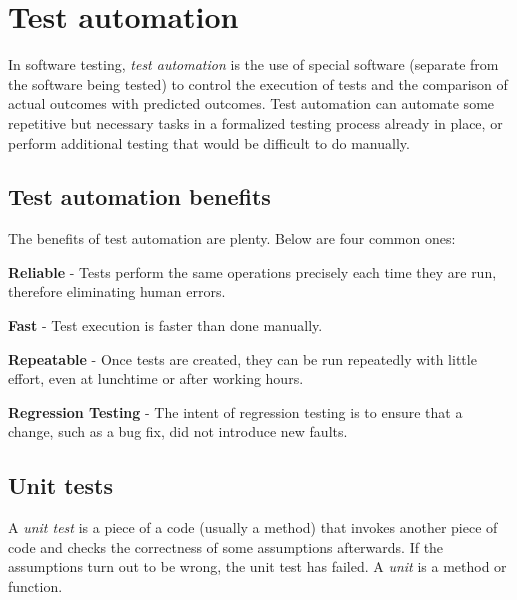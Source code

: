 \documentclass[
  print,
  table,
  nolof,
  nolot,
  nocover,
  oneside
]{fithesis3}
\begin{document}
\chapter{Test automation}
\label{test automation}

In software testing, \textit{test automation} is the use of special software (separate from the software being tested) to control the execution of tests and the comparison of actual outcomes with predicted outcomes. Test automation can automate some repetitive but necessary tasks in a formalized testing process already in place, or perform additional testing that would be difficult to do manually\parencite{test_automation}.

\section{Test automation benefits}
The benefits of test automation are plenty. Below are four common ones:

\begin{compactitem}
    \item \textbf{Reliable} - Tests perform the same operations precisely each time they are run, therefore eliminating human errors.
    \item \textbf{Fast} - Test execution is faster than done manually.
    \item \textbf{Repeatable} - Once tests are created, they can be run repeatedly with little effort, even at lunchtime or after working hours.
    \item \textbf{Regression Testing} - The intent of regression testing is to ensure that a change, such as a bug fix, did not introduce new faults\parencite{test_automation_benefits}.
\end{compactitem}


\section{Unit tests}
\label{unit tests general}

A \textit{unit test} is a piece of a code (usually a method) that invokes another piece of code and checks the correctness of some assumptions afterwards. If the assumptions turn out to be wrong, the unit test has failed. A \textit{unit} is a method or function\parencite{unit_tests}.
\end{document}
